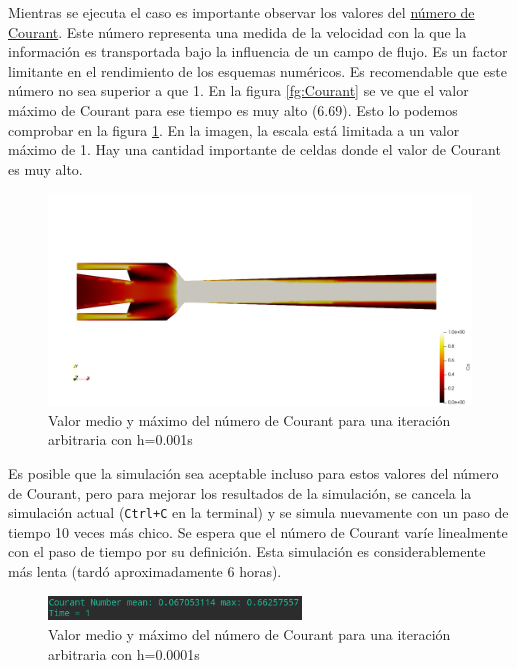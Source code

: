 \documentclass[oneside,a4paper,spanish,links]{amca}
\begin{document}
Mientras se ejecuta el caso es importante observar los valores del \href{https://www.openfoam.com/documentation/guides/latest/doc/guide-fos-field-courant-no.html}{número de Courant}. Este número representa una medida de la velocidad con la que la información es transportada bajo la influencia de un campo de flujo. Es un factor limitante en el rendimiento de los esquemas numéricos. Es recomendable que este número no sea superior a que 1. En la figura \ref{fg:Courant}  se ve que el valor máximo de Courant para ese tiempo es muy alto (6.69). Esto lo podemos comprobar en la figura \ref{fg:pvCourant}. En la imagen, la escala está limitada a un valor máximo de 1. Hay una cantidad importante de celdas donde el valor de Courant es muy alto.

\begin{figure}[htb]	
	\centerline{\includegraphics[width=1\textwidth]{Figuras/03_pvCourant1.png}} 
	\caption{Valor medio y máximo del número de Courant para una iteración arbitraria con h=0.001s} \label{fg:pvCourant}
\end{figure}

Es posible que la simulación sea aceptable incluso para estos valores del número de Courant, pero para mejorar los resultados de la simulación, se cancela la simulación actual (\texttt{Ctrl+C} en la terminal) y se simula nuevamente con un paso de tiempo 10 veces más chico. Se espera que el número de Courant varíe linealmente con el paso de tiempo por su definición. Esta simulación es considerablemente más lenta (tardó aproximadamente 6 horas).

\begin{figure}[htb]
	\centerline{\includegraphics[width=0.6\textwidth]{Figuras/03_Courant2.png}} 
	\caption{Valor medio y máximo del número de Courant para una iteración arbitraria con h=0.0001s} \label{fg:Courant2}
\end{figure}
\end{document}
